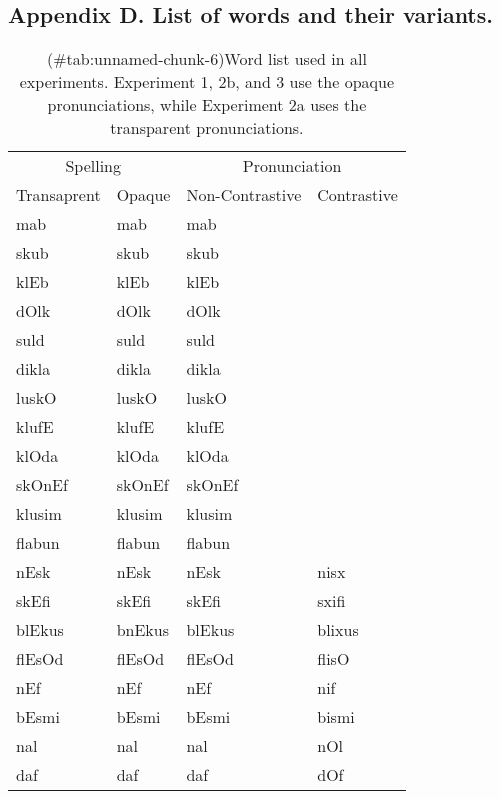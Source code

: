 \clearpage



\begin{appendix}
\section{}
\subsection{Appendix D. List of words and their
variants.}\label{appendix-c}

\begin{table}[!h]

\caption{(\#tab:unnamed-chunk-6)Word list used in all experiments. Experiment 1, 2b, and 3 use the opaque pronunciations, while Experiment 2a uses the transparent pronunciations.}
\centering
\fontsize{8}{10}\selectfont
\begin{tabular}{llll}
\toprule
\multicolumn{2}{c}{Spelling} & \multicolumn{2}{c}{Pronunciation} \\
\cmidrule(l{3pt}r{3pt}){1-2} \cmidrule(l{3pt}r{3pt}){3-4}
Transaprent & Opaque & Non-Contrastive & Contrastive\\
\midrule
mab & mab & mab & \\
skub & skub & skub & \\
klEb & klEb & klEb & \\
dOlk & dOlk & dOlk & \\
suld & suld & suld & \\
dikla & dikla & dikla & \\
luskO & luskO & luskO & \\
klufE & klufE & klufE & \\
klOda & klOda & klOda & \\
skOnEf & skOnEf & skOnEf & \\
klusim & klusim & klusim & \\
flabun & flabun & flabun & \\
nEsk & nEsk & nEsk & nisx\\
skEfi & skEfi & skEfi & sxifi\\
blEkus & bnEkus & blEkus & blixus\\
flEsOd & flEsOd & flEsOd & flisO\\
nEf & nEf & nEf & nif\\
bEsmi & bEsmi & bEsmi & bismi\\
nal & nal & nal & nOl\\
daf & daf & daf & dOf\\

\end{tabular}
\end{table}
\end{appendix}
